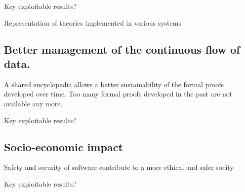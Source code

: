 {\color{red} Key exploitable results?}

Representation of theories implemented in various systems


\subsection{Better management of the continuous flow of data.}

A shared encyclopedia allows a better sustainability of the formal
proofs developed over time. Too many formal proofs developed in the
past are not available any more.

{\color{red} Key exploitable results?}

\subsection{Socio-economic impact}

{\color{red} Safety and security of software contribute to a more ethical
  and safer socity}

{\color{red} Key exploitable results?}
